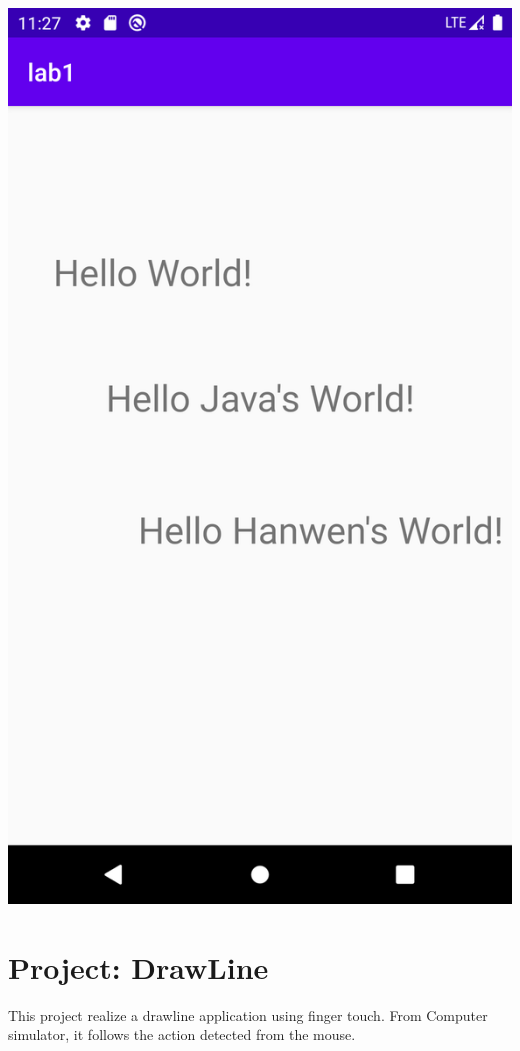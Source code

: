 \documentclass{article}
\begin{document}
	\begin{center}
	\includegraphics[scale=0.4]{demo.png}
	\end{center}
	
	\section{Project: DrawLine}
	
	This project realize a drawline application using finger touch. From Computer simulator, it follows the action detected from the mouse.
	
\end{document}

